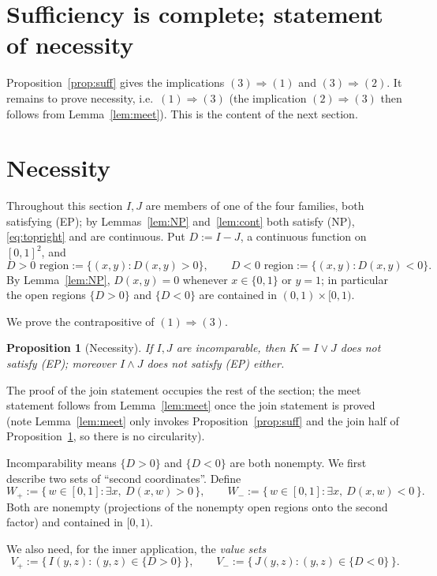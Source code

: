 \documentclass{amsart}
\theoremstyle{plain}
\newtheorem{proposition}{Proposition}
\theoremstyle{definition}
\begin{document}
\section{Sufficiency is complete; statement of necessity}\label{sec:suff-done}

Proposition~\ref{prop:suff} gives the implications $(3)\Rightarrow(1)$ and
$(3)\Rightarrow(2)$. It remains to prove necessity, i.e.\ $(1)\Rightarrow(3)$ (the
implication $(2)\Rightarrow(3)$ then follows from Lemma~\ref{lem:meet}). This is the
content of the next section.

\section{Necessity}\label{sec:nec}

Throughout this section $I,J$ are members of one of the four families, both satisfying
(EP); by Lemmas~\ref{lem:NP} and~\ref{lem:cont} both satisfy (NP), \eqref{eq:topright} and
are continuous. Put $D:=I-J$, a continuous function on $[0,1]^2$, and
\[
D>0\text{ region}:=\{(x,y):D(x,y)>0\},\qquad D<0\text{ region}:=\{(x,y):D(x,y)<0\}.
\]
By Lemma~\ref{lem:NP}, $D(x,y)=0$ whenever $x\in\{0,1\}$ or $y=1$; in particular the open
regions $\{D>0\}$ and $\{D<0\}$ are contained in $(0,1)\times[0,1)$.

We prove the contrapositive of $(1)\Rightarrow(3)$.

\begin{proposition}[Necessity]\label{prop:nec}
If $I,J$ are incomparable, then $K=I\vee J$ does not satisfy \textup{(EP)}; moreover
$I\wedge J$ does not satisfy \textup{(EP)} either.
\end{proposition}

The proof of the join statement occupies the rest of the section; the meet statement
follows from Lemma~\ref{lem:meet} once the join statement is proved (note
Lemma~\ref{lem:meet} only invokes Proposition~\ref{prop:suff} and the join half of
Proposition~\ref{prop:nec}, so there is no circularity).

Incomparability means $\{D>0\}$ and $\{D<0\}$ are both nonempty. We first describe two
sets of ``second coordinates''. Define
\[
W_+:=\{\,w\in[0,1]:\exists x,\ D(x,w)>0\,\},\qquad
W_-:=\{\,w\in[0,1]:\exists x,\ D(x,w)<0\,\}.
\]
Both are nonempty (projections of the nonempty open regions onto the second factor) and
contained in $[0,1)$.

We also need, for the inner application, the \emph{value sets}
\[
V_+:=\{\,I(y,z):(y,z)\in\{D>0\}\,\},\qquad
V_-:=\{\,J(y,z):(y,z)\in\{D<0\}\,\}.
\]
\end{document}
